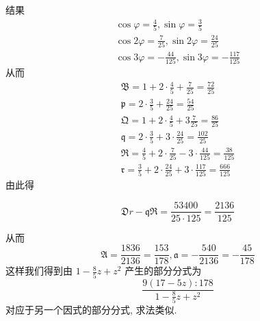 结果
\[
\begin{gathered}
\cos \varphi=\frac{4}{5}, \sin \varphi=\frac{3}{5} \\
\cos 2 \varphi=\frac{7}{25}, \sin 2 \varphi=\frac{24}{25} \\
\cos 3 \varphi=-\frac{44}{125}, \sin 3 \varphi=-\frac{117}{125}
\end{gathered}
\]
从而
\[
\begin{gathered}
\mathfrak{B}=1+2 \cdot \frac{4}{5}+\frac{7}{25}=\frac{72}{25} \\
\mathfrak{p}=2 \cdot \frac{3}{5}+\frac{24}{25}=\frac{54}{25} \\
\mathfrak{Q}=1+2 \cdot \frac{4}{5}+3 \frac{7}{25}=\frac{86}{25} \\
\mathfrak{q}=2 \cdot \frac{3}{5}+3 \cdot \frac{24}{25}=\frac{102}{25} \\
\mathfrak{R}=\frac{4}{5}+2 \cdot \frac{7}{25}-3 \cdot \frac{44}{125}=\frac{38}{125} \\
\mathfrak{r}=\frac{3}{5}+2 \cdot \frac{24}{25}+3 \cdot \frac{117}{125}=\frac{666}{125}
\end{gathered}
\]
由此得

\[
\mathfrak{D}r-\mathfrak{qR}=\frac{53400}{25 \cdot 125}=\frac{2136}{125}
\]

从而
\[
\mathfrak{A}=\frac{1836}{2136}=\frac{153}{178}, \mathfrak{a}=-\frac{540}{2136}=-\frac{45}{178}
\]
这样我们得到由 $1-\frac{8}{5} z+z^{2}$ 产生的部分分式为
\[
\frac{9(17-5 z): 178}{1-\frac{8}{5} z+z^{2}}
\]
对应于另一个因式的部分分式, 求法类似.

